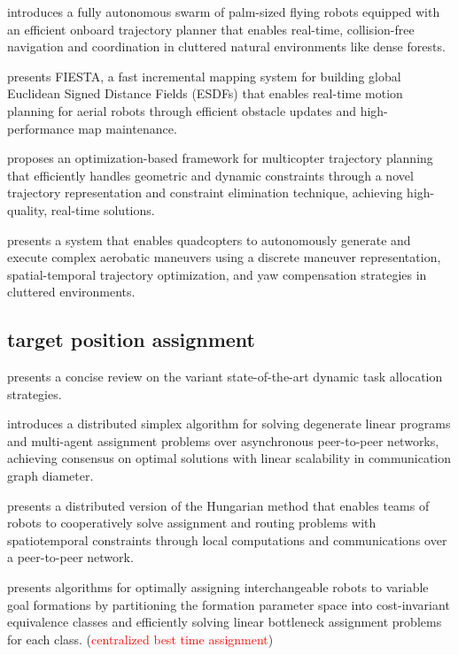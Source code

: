 \cite{zhou2022swarm} introduces a fully autonomous swarm of palm-sized flying robots equipped with an efficient onboard trajectory planner that enables real-time, collision-free navigation and coordination in cluttered natural environments like dense forests.

\cite{han2019fiesta} presents FIESTA, a fast incremental mapping system for building global Euclidean Signed Distance Fields (ESDFs) that enables real-time motion planning for aerial robots through efficient obstacle updates and high-performance map maintenance.

\cite{wang2022geometrically} proposes an optimization-based framework for multicopter trajectory planning that efficiently handles geometric and dynamic constraints through a novel trajectory representation and constraint elimination technique, achieving high-quality, real-time solutions.

\cite{wang2025unlocking} presents a system that enables quadcopters to autonomously generate and execute complex aerobatic maneuvers using a discrete maneuver representation, spatial-temporal trajectory optimization, and yaw compensation strategies in cluttered environments.


\subsection{target position assignment}

\cite{rm2020review} presents a concise review on the variant state-of-the-art dynamic task allocation strategies.

\cite{burger2012distributed} introduces a distributed simplex algorithm for solving degenerate linear programs and multi-agent assignment problems over asynchronous peer-to-peer networks, achieving consensus on optimal solutions with linear scalability in communication graph diameter.

\cite{chopra2017distributed} presents a distributed version of the Hungarian method that enables teams of robots to cooperatively solve assignment and routing problems with spatiotemporal constraints through local computations and communications over a peer-to-peer network.

\cite{akella2020assignment} presents algorithms for optimally assigning interchangeable robots to variable goal formations by partitioning the formation parameter space into cost-invariant equivalence classes and efficiently solving linear bottleneck assignment problems for each class. (\textcolor{red}{centralized best time assignment})

